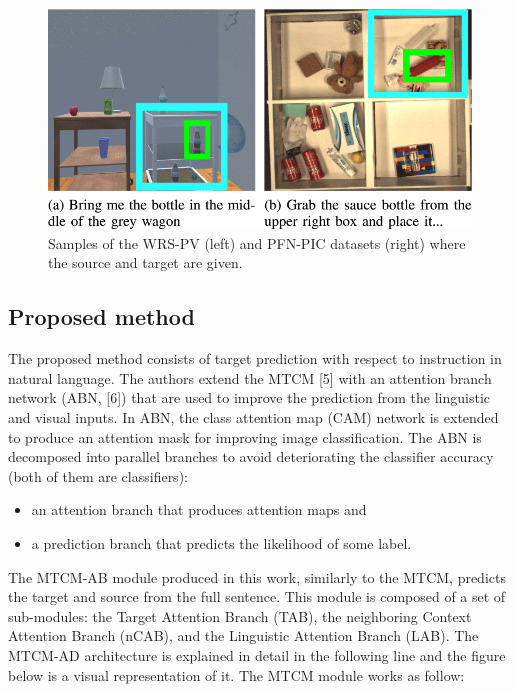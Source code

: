 \begin{figure}[h!]
\centering
\includegraphics[width=0.8\linewidth]{images/WRS-PVexample.png}
\caption{Samples of the WRS-PV (left) and PFN-PIC datasets (right) where the source and target are given.}
\end{figure}

\subsection{Proposed method}\label{header-n281}

The proposed method consists of target prediction with respect to
instruction in natural language. The authors extend the MTCM {[}5{]}
with an attention branch network (ABN, {[}6{]}) that are used to improve
the prediction from the linguistic and visual inputs. In ABN, the class
attention map (CAM) network is extended to produce an attention mask for
improving image classification. The ABN is decomposed into parallel
branches to avoid deteriorating the classifier accuracy (both of them
are classifiers):

\begin{itemize}
\item
  an attention branch that produces attention maps and
\item
  a prediction branch that predicts the likelihood of some label.
\end{itemize}

The MTCM-AB module produced in this work, similarly to the MTCM,
predicts the target and source from the full sentence. This module is
composed of a set of sub-modules: the Target Attention Branch (TAB), the
neighboring Context Attention Branch (nCAB), and the Linguistic
Attention Branch (LAB). The MTCM-AD architecture is explained in detail
in the following line and the figure below is a visual representation of
it. The MTCM module works as follow:

